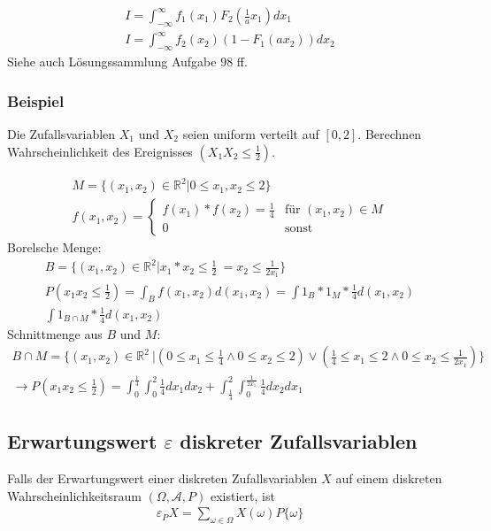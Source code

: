 \documentclass{article}
\begin{document}
\begin{align}
	I = \int_{-\infty}^{\infty} f_1(x_1)F_2(\frac{1}{a}x_1)dx_1\\
	I = \int_{-\infty}^{\infty} f_2(x_2)(1 - F_1(ax_2))dx_2
\end{align}
Siehe auch L\"osungssammlung Aufgabe $98$ ff.

\subsubsection{Beispiel}
Die Zufallsvariablen $X_1$ und $X_2$ seien uniform verteilt auf
$[0, 2]$. Berechnen Wahrscheinlichkeit des Ereignisses $(X_1X_2 \leq \frac{1}{2})$.

\begin{align}
	M = \{(x_1, x_2) \in \mathbb{R}^2 | 0 \leq x_1,x_2 \leq 2\}\\
	f(x_1,x_2) =
	\begin{cases}
		f(x_1)*f(x_2) = \frac{1}{4} & \text{f\"ur } (x_1,x_2) \in M \\
		0 & \text{sonst}
	\end{cases}
\end{align}
Borelsche Menge:
\begin{align}
	B = \{(x_1, x_2) \in \mathbb{R}^2 | x_1*x_2 \leq \frac{1}{2}\ = x_2 \leq \frac{1}{2 x_1}\} \\
	P(x_1x_2 \leq \frac{1}{2}) = \int_B f(x_1, x_2) d(x_1, x_2) = \int 1_B*1_M*\frac{1}{4}
	d(x_1,x_2)\\
	\int 1_{B \cap M} * \frac{1}{4} d(x_1,x_2)
\end{align}
Schnittmenge aus $B$ und $M$:
\begin{align}
	B \cap M = \{(x_1, x_2) \in \mathbb{R}^2\ | (0 \leq x_1 \leq \frac{1}{4} \wedge 0 \leq x_2 \leq
	2) \vee (\frac{1}{4} \leq x_1 \leq 2 \wedge 0 \leq x_2 \leq \frac{1}{2x_1})\}\\
	\longrightarrow
	P(x_1x_2 \leq \frac{1}{2}) = \int^{\frac{1}{4}}_{0} \int^2_0 \frac{1}{4} dx_1dx_2
	+ \int^2_{\frac{1}{4}} \int^{\frac{1}{2x_1}}_0 \frac{1}{4} dx_2 dx_1
\end{align}
\subsection{Erwartungswert $\varepsilon$ diskreter Zufallsvariablen}
Falls der Erwartungswert einer diskreten Zufallsvariablen $X$ auf
einem diskreten Wahrscheinlichkeitsraum $(\Omega, \mathcal{A}, P)$ existiert,
ist
\begin{align}
	\varepsilon_P X = \sum_{\omega \in \Omega} X(\omega)P\{\omega\}
\end{align}
\end{document}
